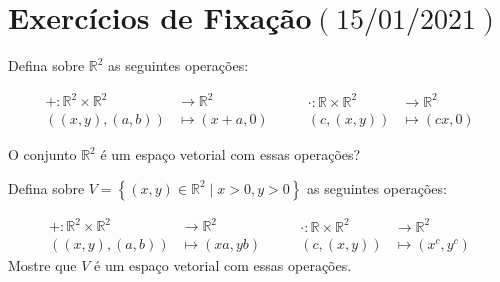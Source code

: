\chapter{Exercícios de Fixação\quad$\left(15/01/2021\right)$}

\begin{questions}
  \question\label{exercício:2.1}

  Defina sobre $\mathbb{R}^{2}$ as seguintes operações:

  \[
    \begin{aligned}
      +\colon\mathbb{R}^{2}\times\mathbb{R}^{2}      & \longrightarrow\mathbb{R}^{2} \\
      \left(\left(x,y\right),\left(a,b\right)\right) & \longmapsto
      \left(x+a,0\right)
    \end{aligned}\qquad
    \begin{aligned}
      \cdot\colon\mathbb{R}\times\mathbb{R}^{2} & \longrightarrow\mathbb{R}^{2} \\
      \left(c,\left(x,y\right)\right)           & \longmapsto
      \left(cx,0\right)
    \end{aligned}
  \]

  O conjunto $\mathbb{R}^{2}$ é um espaço vetorial com essas operações?

  \begin{solutionordottedlines}
  \end{solutionordottedlines}

  \question\label{exercício:2.2}

  Defina sobre
  \begin{math}
    V=
    \left\{
    \left(x,y\right)\in
    \mathbb{R}^{2}\mid
    x>0,y>0
    \right\}
  \end{math}
  as seguintes operações:

  \[
    \begin{aligned}
      +\colon\mathbb{R}^{2}\times\mathbb{R}^{2}      & \longrightarrow\mathbb{R}^{2} \\
      \left(\left(x,y\right),\left(a,b\right)\right) & \longmapsto
      \left(xa,yb\right)
    \end{aligned}\qquad
    \begin{aligned}
      \cdot\colon\mathbb{R}\times\mathbb{R}^{2} & \longrightarrow\mathbb{R}^{2} \\
      \left(c,\left(x,y\right)\right)           & \longmapsto
      \left(x^{c},y^{c}\right)
    \end{aligned}
  \]
  Mostre que $V$ é um espaço vetorial com essas operações.


\end{questions}
